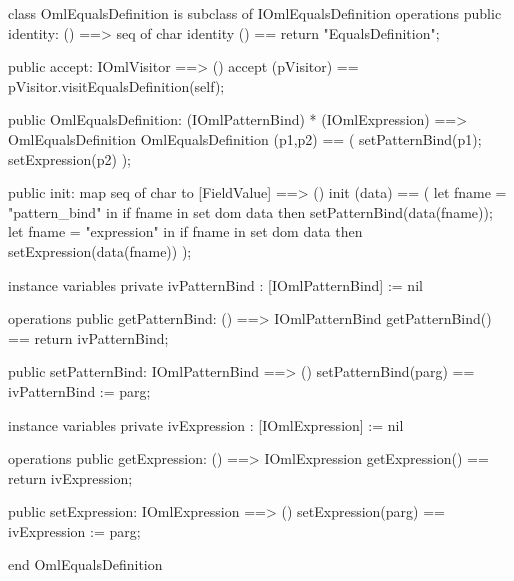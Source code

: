 \begin{vdm_al}
class OmlEqualsDefinition is subclass of IOmlEqualsDefinition
operations
  public identity: () ==> seq of char
  identity () == return "EqualsDefinition";

  public accept: IOmlVisitor ==> ()
  accept (pVisitor) == pVisitor.visitEqualsDefinition(self);

  public OmlEqualsDefinition:
      (IOmlPatternBind) *
      (IOmlExpression) ==> OmlEqualsDefinition
  OmlEqualsDefinition (p1,p2) == 
   ( setPatternBind(p1);
     setExpression(p2) );

  public init: map seq of char to [FieldValue] ==> ()
  init (data) ==
    ( let fname = "pattern_bind" in
        if fname in set dom data
        then setPatternBind(data(fname));
      let fname = "expression" in
        if fname in set dom data
        then setExpression(data(fname)) );

instance variables
  private ivPatternBind : [IOmlPatternBind] := nil

operations
  public getPatternBind: () ==> IOmlPatternBind
  getPatternBind() == return ivPatternBind;

  public setPatternBind: IOmlPatternBind ==> ()
  setPatternBind(parg) == ivPatternBind := parg;

instance variables
  private ivExpression : [IOmlExpression] := nil

operations
  public getExpression: () ==> IOmlExpression
  getExpression() == return ivExpression;

  public setExpression: IOmlExpression ==> ()
  setExpression(parg) == ivExpression := parg;

end OmlEqualsDefinition
\end{vdm_al}

